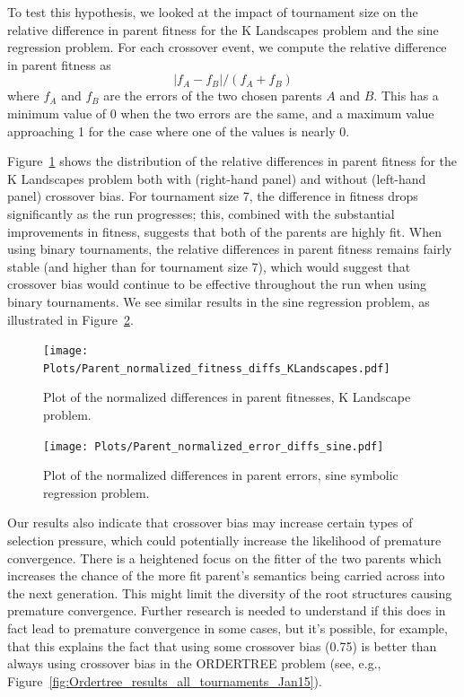 \documentclass{sig-alternate}
\begin{document}

To test this hypothesis, we looked at the impact of tournament size on the relative difference in parent fitness for
the K Landscapes problem and the sine regression problem. For each crossover event, we compute the relative difference
in parent fitness as
\[
	|f_A - f_B| / (f_A + f_B)
\]
where $f_A$ and $f_B$ are the errors of the two chosen parents $A$ and $B$. This has a minimum value of 0 when the two
errors are the same, and a maximum value approaching 1 for the case where one of the values is nearly 0.

Figure~\ref{fig:parentDiffsKLandscapes} shows the distribution of the relative differences in parent fitness for the K
Landscapes problem both with (right-hand panel) and without (left-hand panel) crossover bias. 
For tournament size 7, the difference in fitness drops
significantly as the run progresses; this, combined with the substantial improvements in fitness, suggests that 
both of the parents are highly fit. When using binary
tournaments, the relative differences in parent fitness remains fairly stable (and higher than for tournament size 7), 
which would suggest that
crossover bias would continue to be effective throughout the run when using binary tournaments. We see similar results
in the sine regression problem, as illustrated in Figure~\ref{fig:parentDiffsSine}.

\begin{figure}[tb]
\centering
\texttt{[image: Plots/Parent\_normalized\_fitness\_diffs\_KLandscapes.pdf]}
\caption{Plot of the normalized differences in parent fitnesses, K Landscape problem.}
\label{fig:parentDiffsKLandscapes}
\end{figure}

\begin{figure}[tb]
	\centering
	\texttt{[image: Plots/Parent\_normalized\_error\_diffs\_sine.pdf]}
	\caption{Plot of the normalized differences in parent errors, sine symbolic regression problem.}
	\label{fig:parentDiffsSine}
\end{figure}

Our results also indicate that crossover bias may increase certain types of selection pressure, which could potentially
increase the likelihood of premature convergence.
There is a heightened focus on the fitter of the two parents which increases the chance of the more fit parent's
semantics being carried across into the next generation. This might limit the diversity of the root structures causing
premature convergence. Further research is needed to understand if this does in fact lead to premature convergence in
some cases, but it's possible, for example, that this explains the fact that using some crossover bias (0.75) is better
than always using crossover bias in the ORDERTREE problem (see, e.g.,
Figure~\ref{fig:Ordertree_results_all_tournaments_Jan15}).
\end{document}
